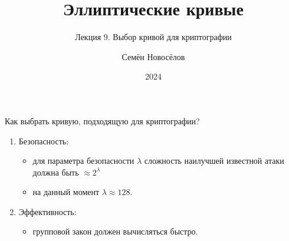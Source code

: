 \documentclass{beamer}
\title{Эллиптические кривые}
\subtitle{Лекция 9. Выбор кривой для криптографии}
\author{Семён Новосёлов}
\institute{БФУ им. И. Канта}
\date{2024}
\begin{document}
\frame{\titlepage}


\begin{frame}{Как выбрать кривую, подходящую для криптографии?}
\begin{enumerate}
    \item Безопасность: 
    
    \vspace{0.3em}
    
    \begin{itemize}
    	\item для параметра безопасности $\lambda$ сложность наилучшей известной атаки должна быть $\approx 2^\lambda$
    	\vspace{0.2em}
    	\item на данный момент $\lambda \approx 128$.
    \end{itemize}
    \vspace{0.2em}
    \item Эффективность: 
    \begin{itemize}
    	\item групповой закон должен вычисляться быстро.
    \end{itemize}
\end{enumerate}
\end{frame}
\end{document}
